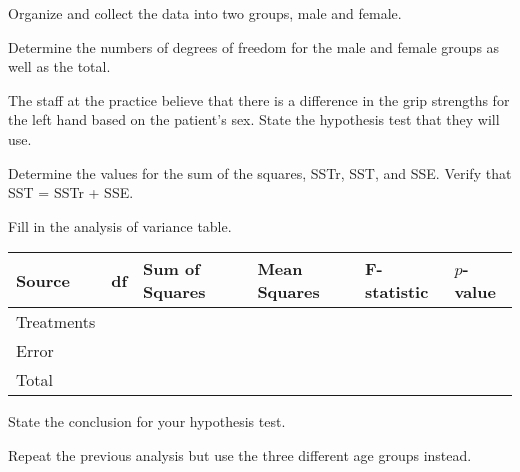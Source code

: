 \begin{problem}
  \item Organize and collect the data into two groups, male and
    female. 
    \vfill

  \item Determine the numbers of degrees of freedom for the male and
    female groups as well as the total.

    \vspace{5em}

  \item The staff at the practice believe that there is a difference
    in the grip strengths for the left hand based on the patient's
    sex. State the hypothesis test that they will use.

    \vfill

    \clearpage
    
  \item Determine the values for the sum of the squares, SSTr, SST,
    and SSE.  Verify that SST = SSTr + SSE.

    \vfill

  \item Fill in the analysis of variance table. 

    \begin{tabular}{|l|l|l|l|l|l|} \hline
      Source & df & Sum of Squares & Mean Squares & F-statistic & $p$-value \\ \hline
      Treatments & & & & & \\ \hline
      Error & & & & &  \\ \hline
      Total & & & & &  \\ \hline
    \end{tabular}

  \item State the conclusion for your hypothesis test.

    \vspace{5em}

    \clearpage

  \item Repeat the previous analysis but use the three different age groups instead.

    \clearpage
    

\end{problem}




\begin{problem}
\item ~  
\end{problem}
